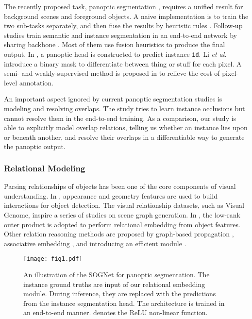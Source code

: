 \documentclass[letterpaper]{article} \usepackage{aaai20}  \usepackage{times}  \usepackage{helvet} \usepackage{courier}  \usepackage[hyphens]{url}  \usepackage{graphicx} \urlstyle{rm} \def\UrlFont{\rm}  \usepackage{graphicx}  \frenchspacing  \setlength{\pdfpagewidth}{8.5in}  \setlength{\pdfpageheight}{11in}
\begin{document}
The recently proposed task, panoptic segmentation \cite{kirillov2018panoptic}, requires a unified result for background scenes and foreground objects. A naive implementation is to train the two sub-tasks separately, and then fuse the results by heuristic rules \cite{kirillov2018panoptic}. Follow-up studies train semantic and instance segmentation in an end-to-end network by sharing backbone \cite{de2018panoptic,kirillov2019panoptic,li2018attention,liu2019end,xiong2019upsnet,mapillary,yang2019deeperlab,li2018learning}. Most of them use fusion heuristics to produce the final output. In \cite{liu2019end,xiong2019upsnet}, a panoptic head is constructed to predict instance \verb|id|. Li \emph{et al.} \cite{li2018learning} introduce a binary mask to differentiate between thing or stuff for each pixel. A semi- and weakly-supervised method is proposed in \cite{li2018weakly} to relieve the cost of pixel-level annotation. 

An important aspect ignored by current panoptic segmentation studies is modeling and resolving overlaps. The study \cite{lazarow2019learning} tries to learn instance occlusions but cannot resolve them in the end-to-end training. As a comparison, our study is able to explicitly model overlap relations, telling us whether an instance lies upon or beneath another, and resolve their overlaps in a differentiable way to generate the panoptic output. 

\subsubsection{Relational Modeling}

Parsing relationships of objects has been one of the core components of visual understanding. In \cite{hu2018relation}, appearance and geometry features are used to build interactions for object detection. The visual relationship datasets, such as Visual Genome, inspire a series of studies on scene graph generation. In \cite{zellers2018neural,woo2018linknet}, the low-rank outer product \cite{kim2016hadamard} is adopted to perform relational embedding from object features. Other relation reasoning methods are proposed by graph-based propagation \cite{xu2017scene}, associative embedding \cite{newell2017pixels}, and introducing an efficient module \cite{santoro2017simple}. 


\begin{figure*}[!th]
	\vspace{-2mm}
	\centering
\texttt{[image: fig1.pdf]}
\vspace{-2mm}
	\caption{An illustration of the SOGNet for panoptic segmentation. The instance ground truths are input of our relational embedding module. During inference, they are replaced with the predictions from the instance segmentation head. The architecture is trained in an end-to-end manner.  denotes the ReLU non-linear function.}
	\vspace{-2mm}
	\label{fig2}
\end{figure*}
\end{document}
